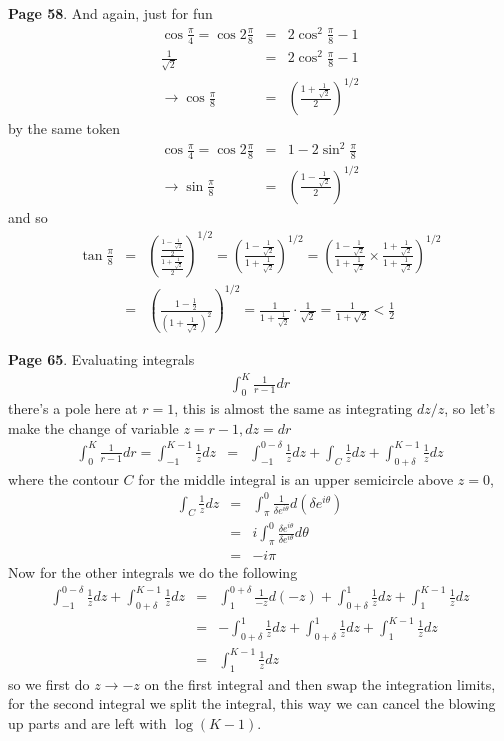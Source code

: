 \documentclass[aps,preprint,preprintnumbers,nofootinbib,showpacs,prd]{revtex4-1}
\newcommand{\nbea}{\begin{eqnarray*}}
\newcommand{\neea}{\end{eqnarray*}}
\begin{document}
{\bf Page 58}. And again, just for fun
%
\nbea
\cos \frac{\pi}{4} = \cos 2 \frac{\pi}{8} & = & 2 \cos^2 \frac{\pi}{8} - 1 \\
\frac{1}{\sqrt{2}} & = & 2 \cos^2 \frac{\pi}{8} - 1 \\
\to \cos \frac{\pi}{8} & = & \left(\frac{1 + \frac{1}{\sqrt{2}}}{2}\right)^{1/2}
\neea
%
by the same token
%
\nbea
\cos \frac{\pi}{4} = \cos 2 \frac{\pi}{8} & = & 1 - 2 \sin^2 \frac{\pi}{8} \\
\to \sin \frac{\pi}{8} & = & \left(\frac{1 - \frac{1}{\sqrt{2}}}{2}\right)^{1/2}
\neea
%
and so
%
\nbea
\tan \frac{\pi}{8} & = & \left (\frac{\frac{1 - \frac{1}{\sqrt{2}}}{2}}{\frac{1 + \frac{1}{\sqrt{2}}}{2}} \right )^{1/2} = \left (\frac{1 - \frac{1}{\sqrt{2}}}{1 + \frac{1}{\sqrt{2}}} \right )^{1/2} = \left (\frac{1 - \frac{1}{\sqrt{2}}}{1 + \frac{1}{\sqrt{2}}} \times \frac{1 + \frac{1}{\sqrt{2}}}{1 + \frac{1}{\sqrt{2}}}\right )^{1/2} \\
& = & \left(\frac{1 - \frac{1}{2}}{\left(1 + \frac{1}{\sqrt{2}}\right)^2} \right) ^{1/2} = \frac{1}{1 + \frac{1}{\sqrt{2}}}\cdot \frac{1}{\sqrt{2}} = \frac{1}{1 + \sqrt{2}} < \frac{1}{2}
\neea
%

{\bf Page 65}. Evaluating integrals
%
\nbea
\int_0^K \frac{1}{r-1} dr
\neea
%
there's a pole here at $r = 1$, this is almost the same as integrating $dz/z$, so let's make the change of variable $z = r-1, dz = dr$
%
\nbea
\int_0^K \frac{1}{r-1} dr = \int_{-1}^{K-1} \frac{1}{z} dz & = & \int_{-1}^{0-\delta} \frac{1}{z} dz  + \int_C \frac{1}{z} dz + \int_{0+\delta}^{K-1} \frac{1}{z} dz
\neea
%
where the contour $C$ for the middle integral is an upper semicircle above $z = 0$, 
%
\nbea
\int_C \frac{1}{z} dz & = & \int_{\pi}^{0} \frac{1}{\delta e^{i\theta}} d(\delta e^{i\theta}) \\
& = & i\int_{\pi}^{0} \frac{\delta e^{i\theta}}{\delta e^{i\theta}} d\theta \\
& = & -i\pi
\neea
%
Now for the other integrals we do the following
%
\nbea
\int_{-1}^{0-\delta} \frac{1}{z} dz  + \int_{0+\delta}^{K-1} \frac{1}{z} dz & = & \int_{1}^{0+\delta} \frac{1}{-z} d(-z)  + \int_{0+\delta}^{1} \frac{1}{z} dz + \int_{1}^{K-1} \frac{1}{z} dz \\
& = & -\int_{0+\delta}^{1} \frac{1}{z} dz  + \int_{0+\delta}^{1} \frac{1}{z} dz + \int_{1}^{K-1} \frac{1}{z} dz \\
& = & \int_{1}^{K-1} \frac{1}{z} dz
\neea
%
so we first do $z\to-z$ on the first integral and then swap the integration limits, for the second integral we split the integral, this way we can cancel the blowing up parts and are left with $\log(K-1)$.
\end{document}
